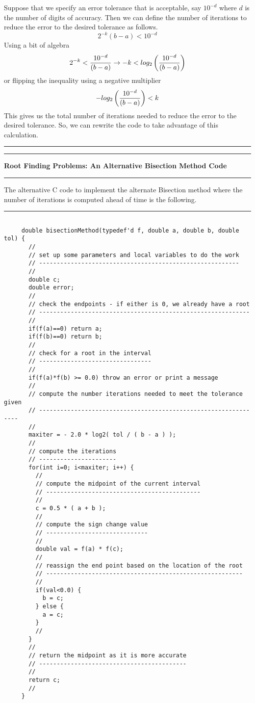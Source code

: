 \documentclass[10pt,fleqn]{article}
\begin{document}
Suppose that we specify an error tolerance that is acceptable, say $10^{-d}$
where $d$ is the number of digits of accuracy. Then we can define the number of
iterations to reduce the error to the desired tolerance as follows.
$$
  2^{-k} ( b - a ) < 10^{-d}
$$
Using a bit of algebra
$$
  2^{-k} < {{10^{-d}}\over{(b-a)}}
   \rightarrow -k < log_2\left( {{10^{-d}}\over{(b-a)}}\right)
$$
or flipping the inequality using a negative multiplier
$$
  - log_2\left( {{10^{-d}}\over{(b-a)}}\right) < k 
$$
This gives us the total number of iterations needed to reduce the error to the
desired tolerance. So, we can rewrite the code to take advantage of this
calculation.
\vskip0.1in\hrule\vskip0.1in
\newpage
\vskip0.1in\hrule\vskip0.1in
\noindent
{\bf Root Finding Problems: An Alternative Bisection Method Code}
\vskip0.1in\hrule\vskip0.1in
\noindent
The alternative C code to implement the alternate Bisection method where the
number of iterations is computed ahead of time is the following.
\vskip0.1in\hrule\vskip0.1in
\begin{verbatim}

     double bisectionMethod(typedef'd f, double a, double b, double tol) {
       //
       // set up some parameters and local variables to do the work
       // ---------------------------------------------------------
       //
       double c;
       double error;
       //
       // check the endpoints - if either is 0, we already have a root
       // ------------------------------------------------------------
       //
       if(f(a)==0) return a;
       if(f(b)==0) return b;
       //
       // check for a root in the interval
       // --------------------------------
       //
       if(f(a)*f(b) >= 0.0) throw an error or print a message
       //
       // compute the number iterations needed to meet the tolerance given
       // ----------------------------------------------------------------
       //
       maxiter = - 2.0 * log2( tol / ( b - a ) );
       //
       // compute the iterations
       // ----------------------
       for(int i=0; i<maxiter; i++) {
         //
         // compute the midpoint of the current interval
         // --------------------------------------------
         //
         c = 0.5 * ( a + b );
         //
         // compute the sign change value
         // -----------------------------
         //
         double val = f(a) * f(c);
         //
         // reassign the end point based on the location of the root
         // --------------------------------------------------------
         //
         if(val<0.0) {
           b = c;
         } else {
           a = c;
         }
         //
       }
       //
       // return the midpoint as it is more accurate
       // ------------------------------------------
       //
       return c;
       //
     }

\end{verbatim}
\end{document}
